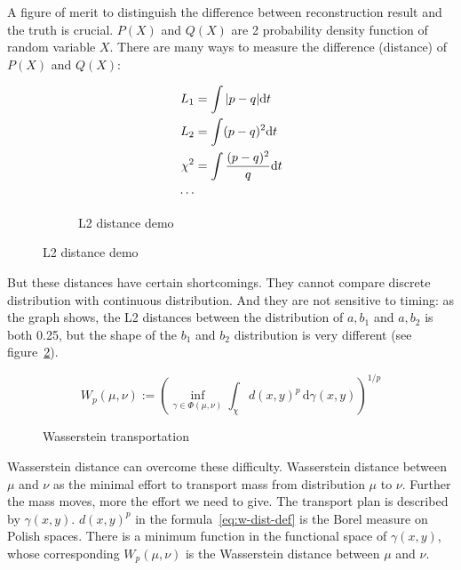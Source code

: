 A figure of merit to distinguish the difference between reconstruction result and the truth is crucial. $P(X)$ and $Q(X)$ are 2 probability density function of random variable $X$. There are many ways to measure the difference (distance) of $P(X)$ and $Q(X)$: 

\begin{figure}[H]
\begin{minipage}{.25\textwidth}
\begin{align*}
    L_{1} &= \int|p-q| \mathrm{d} t \\
    L_{2} &= \int(p-q)^{2} \mathrm{d} t \\
    \chi^{2} &= \int\frac{(p-q)^{2}}{q} \mathrm{d} t \\
    \cdots
\end{align*}
\end{minipage}
\begin{minipage}{.7\textwidth}
\begin{figure}[H]
    \centering
    \scalebox{0.4}{}
    \caption{\label{fig:l2} L2 distance demo}
\end{figure}
\end{minipage}
\end{figure}

But these distances have certain shortcomings. They cannot compare discrete distribution with continuous distribution. And they are not sensitive to timing: as the graph shows, the L2 distances between the distribution of $a,b_{1}$ and $a,b_{2}$ is both 0.25, but the shape of the $b_{1}$ and $b_{2}$ distribution is very different (see figure~\ref{fig:l2}). 

\label{sub:Wasserstein distance}
    \begin{equation}
        W_{p}(\mu,\nu):=\left(\inf_{\gamma\in\Phi(\mu,\nu)}\int_{\chi}d(x,y)^{p}\,\mathrm{d}\gamma(x,y)\right)^{1/p} \label{eq:w-dist-def}
    \end{equation}
    \begin{figure}[H]
        \centering
        \scalebox{0.4}{}
        \caption{\label{fig:Wasserstein transportation} Wasserstein transportation}
    \end{figure}

Wasserstein distance can overcome these difficulty. Wasserstein distance between $\mu$ and $\nu$ as the minimal effort to transport mass from distribution $\mu$ to $\nu$. Further the mass moves, more the effort we need to give. The transport plan is described by $\gamma(x, y)$. $d(x,y)^{p}$ in the formula~\eqref{eq:w-dist-def} is the Borel measure on Polish spaces\cite{villani_2009}. There is a minimum function in the functional space of $\gamma(x, y)$, whose corresponding $W_{p}(\mu ,\nu)$ is the Wasserstein distance between $\mu$ and $\nu$. 

